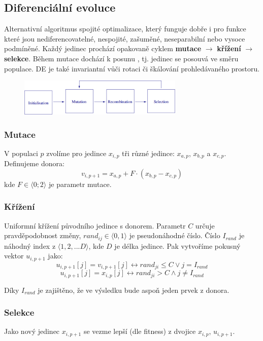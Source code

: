 \subsection{Diferenciální evoluce}
Alternativní algoritmus spojité optimalizace, který funguje dobře i pro funkce které jsou nediferencovatelné, nespojité, zašuměné, neseparabilní nebo vysoce podmíněné. Každý jedinec prochází opakovaně cyklem \textbf{mutace} $\rightarrow$ \textbf{křížení} $\rightarrow$ \textbf{selekce}. Během mutace dochází k posunu , tj. jedinec se posouvá ve směru populace. DE je také invariantní vůči rotaci či škálování prohledávaného prostoru.
\begin{figure}[H]
	\centering
	\includegraphics[width=0.7\textwidth]{img/DE_scheme.png}
\end{figure}

\subsubsection{Mutace}
V populaci $p$ zvolíme pro jedince $x_{i,p}$ tři různé jedince: $x_{a,p}$, $x_{b,p}$ a $x_{c,p}$. Definujeme donora: $$v_{i,p+1} = x_{a,p} + F \cdot (x_{b,p} - x_{c,p})$$ kde $F \in \langle 0; 2 \rangle$ je parametr mutace.
\subsubsection{Křížení}
Uniformní křížení původního jedince s donorem. Parametr $C$ určuje pravděpodobnost změny, $rand_{ij} \in \langle0,1\rangle$ je pseudonáhodné číslo. Číslo $I_{rand}$ je náhodný index z $\langle 1,2,...D\rangle$, kde $D$ je délka jedince. Pak vytvoříme pokusný vektor $u_{i,p+1}$ jako:
$$u_{i,p+1}[j] = v_{i,p+1}[j] \leftrightarrow rand_{ji} \leq C \lor j = I_{rand}$$
$$u_{i,p+1}[j] = x_{i,p}[j] \leftrightarrow rand_{ji} > C \land j \neq I_{rand}$$

Díky $I_{rand}$ je zajištěno, že ve výsledku bude aspoň jeden prvek z donora.

\subsubsection{Selekce}
Jako nový jedinec $x_{i,p+1}$ se vezme lepší (dle fitness) z dvojice $x_{i,p}$, $u_{i,p+1}$.

